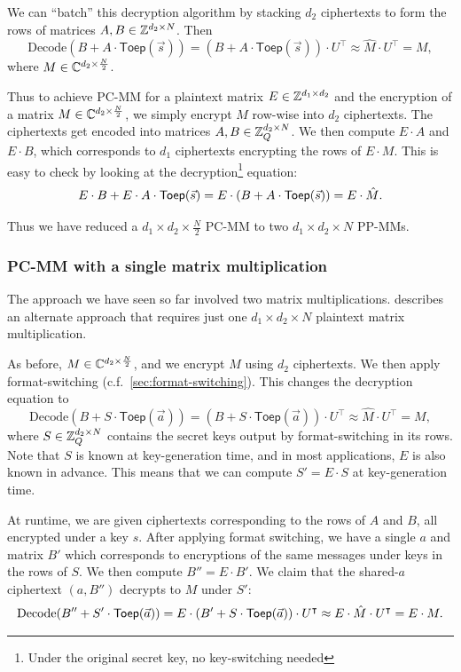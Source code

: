 \documentclass[../fheimpl.tex]{subfiles}
\begin{document}
We can ``batch'' this decryption algorithm by stacking $d_2$ ciphertexts to form the rows of matrices $A, B\in \Z^{d_2\times N}$. Then
\[\mathrm{Decode}(B + A\cdot\mathsf{Toep}(\vec{s})) = (B + A\cdot\mathsf{Toep}(\vec{s}))\cdot U^\intercal \approx \hat{M}\cdot U^\intercal = M,\]
where $M\in\C^{d_2\times\frac{N}{2}}$.

Thus to achieve PC-MM for a plaintext matrix $E\in\Z^{d_1\times d_2}$ and the encryption of a matrix $M\in\C^{d_2\times \frac{N}{2}}$, we simply encrypt $M$ row-wise into $d_2$ ciphertexts. The ciphertexts get encoded into matrices $A,B\in\Z_Q^{d_2\times N}$. We then compute $E\cdot A$ and $E\cdot B$, which corresponds to $d_1$ ciphertexts encrypting the rows of $E\cdot M$. This is easy to check by looking at the decryption\footnote{Under the original secret key, no key-switching needed} equation:
\[E\cdot B + E\cdot A\cdot \mathsf{Toep}(\vec{s}) = E\cdot \parens*{B+A\cdot \mathsf{Toep}(\vec{s})} = E\cdot \hat{M}.\]

Thus we have reduced a $d_1\times d_2\times \frac{N}{2}$ PC-MM to two $d_1\times d_2\times N$ PP-MMs.

\subsubsection{PC-MM with a single matrix multiplication}
The approach we have seen so far involved two matrix multiplications. \cite{cryptoeprint:2024/1284} describes an alternate approach that requires just one $d_1\times d_2\times N$ plaintext matrix multiplication.

As before, $M\in\C^{d_2\times \frac{N}{2}}$, and we encrypt $M$ using $d_2$ ciphertexts. We then apply format-switching (c.f.~\cref{sec:format-switching}). This changes the decryption equation to
\[\mathrm{Decode}(B + S\cdot\mathsf{Toep}(\vec{a})) = (B + S\cdot\mathsf{Toep}(\vec{a}))\cdot U^\intercal \approx \hat{M}\cdot U^\intercal = M,\]
where $S\in\Z_Q^{d_2\times N}$ contains the secret keys output by format-switching in its rows. Note that $S$ is known at key-generation time, and in most applications, $E$ is also known in advance. This means that we can compute $S'=E\cdot S$ at key-generation time. 

At runtime, we are given ciphertexts corresponding to the rows of $A$ and $B$, all encrypted under a key $s$. After applying format switching, we have a single $a$ and matrix $B'$ which corresponds to encryptions of the same messages under keys in the rows of $S$. We then compute $B''=E\cdot B'$. We claim that the shared-$a$ ciphertext $(a, B'')$ decrypts to $M$ under $S'$:
\[\mathrm{Decode}(B'' + S'\cdot\mathsf{Toep}(\vec{a})) = E\cdot \parens*{B' + S\cdot\mathsf{Toep}(\vec{a})}\cdot U^\intercal \approx E\cdot \hat{M}\cdot U^\intercal = E\cdot M.\]
\end{document}
